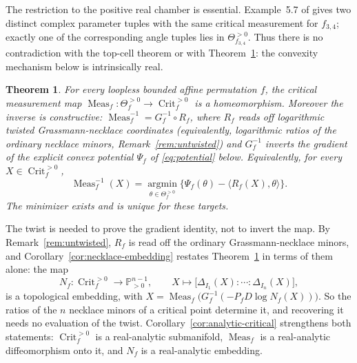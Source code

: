 \documentclass[11pt]{article}
\newtheorem{theorem}{Theorem}
\theoremstyle{definition}
\DeclareMathOperator{\Meas}{Meas}
\DeclareMathOperator{\Crit}{Crit}
\newcommand{\Thef}{\Theta_f^{>0}}
\newcommand{\Critf}{\Crit_f^{>0}}
\begin{document}
The restriction to the positive real chamber is essential. Example~5.7 of \cite{Galashin} gives two
distinct complex parameter tuples with the same critical measurement for $f_{3,4}$; exactly one of the
corresponding angle tuples lies in $\Theta_{f_{3,4}}^{>0}$. Thus there is no contradiction with the
top-cell theorem or with Theorem~\ref{thm:main}: the convexity mechanism below is intrinsically real.

\begin{theorem}\label{thm:main}
For every loopless bounded affine permutation $f$, the critical measurement map
$\Meas_f\colon\Thef\to\Critf$ is a homeomorphism. Moreover the inverse is constructive:
$\Meas_f^{-1}=G_f^{-1}\circ R_f$, where $R_f$ reads off logarithmic twisted Grassmann-necklace coordinates (equivalently, logarithmic
ratios of the ordinary necklace minors, Remark~\ref{rem:untwisted}) and $G_f^{-1}$ inverts the gradient of the explicit convex potential $\Psi_f$ of
\eqref{eq:potential} below. Equivalently, for every $X\in\Critf$,
\begin{equation}\label{eq:variational-inverse}
 \Meas_f^{-1}(X)=\operatorname*{argmin}_{\theta\in\Thef}
 \bigl\{\Psi_f(\theta)-\langle R_f(X),\theta\rangle\bigr\}.
\end{equation}
The minimizer exists and is unique for these targets.
\end{theorem}

The twist is needed to prove the gradient identity, not to invert the map. By
Remark~\ref{rem:untwisted}, $R_f$ is read off the ordinary Grassmann-necklace minors, and
Corollary~\ref{cor:necklace-embedding} restates Theorem~\ref{thm:main} in terms of them alone: the map
\[
 N_f\colon\Critf\to\mathbb P^{n-1}_{>0},\qquad X\mapsto\bigl[\Delta_{I_1}(X):\cdots:\Delta_{I_n}(X)\bigr],
\]
is a topological embedding, with $X=\Meas_f\bigl(G_f^{-1}(-P_fD\log N_f(X))\bigr)$. So the ratios of the
$n$ necklace minors of a critical point determine it, and recovering it needs no evaluation of the twist.
Corollary~\ref{cor:analytic-critical} strengthens both statements: $\Critf$ is a real-analytic submanifold, $\Meas_f$ is
a real-analytic diffeomorphism onto it, and $N_f$ is a real-analytic embedding.
\end{document}
